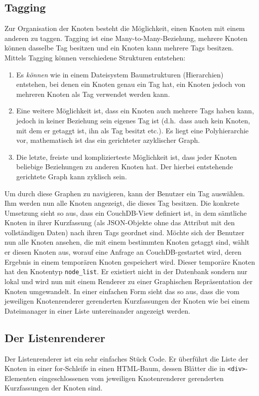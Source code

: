 \documentclass[12pt,ngerman,a4]{scrartcl}
\newcommand{\pquote}[1]{\glqq #1\grqq}
\newcommand{\code}[1]{\texttt{#1}}
\begin{document}
\subsection{Tagging}
Zur Organisation der Knoten besteht die Möglichkeit, einen Knoten mit einem anderen zu \pquote{taggen}. Tagging ist %
eine \pquote{Many-to-Many}-Beziehung, mehrere Knoten können dasselbe Tag besitzen und ein Knoten kann mehrere Tags besitzen. Mittels Tagging können verschiedene Strukturen entstehen:
\begin{enumerate}
\item Es \emph{können} wie in einem Dateisystem Baumstrukturen (Hierarchien) entstehen, bei denen ein Knoten genau ein Tag hat, ein Knoten jedoch von mehreren Knoten als Tag verwendet werden kann.
\item Eine weitere Möglichkeit ist, dass ein Knoten auch mehrere Tags haben kann, jedoch in keiner Beziehung sein eigenes Tag ist (d.h.\ dass auch kein Knoten, mit dem er getaggt ist, ihn als Tag besitzt etc.). Es liegt eine Polyhierarchie vor, mathematisch ist das ein gerichteter azyklischer Graph. 
\item Die letzte, freiste und komplizierteste Möglichkeit ist, dass jeder Knoten beliebige Beziehungen zu anderen Knoten hat. Der hierbei entstehende gerichtete Graph kann zyklisch sein.
\end{enumerate}
Um durch diese Graphen zu navigieren, kann der Benutzer ein Tag auswählen. Ihm werden nun alle Knoten angezeigt, die dieses Tag besitzen. Die konkrete Umsetzung sieht so aus, dass ein CouchDB-View definiert ist, in dem sämtliche Knoten in ihrer Kurzfassung (als JSON-Objekte ohne das Attribut mit den vollständigen Daten) nach ihren Tags geordnet sind. Möchte sich der Benutzer nun alle Knoten ansehen, die mit einem bestimmten Knoten getaggt sind, wählt er diesen Knoten aus, worauf eine Anfrage an CouchDB-gestartet wird, deren Ergebnis in einem temporären Knoten gespeichert wird. Dieser temporäre Knoten hat den Knotentyp \code{node\_list}. Er existiert nicht in der Datenbank sondern nur lokal und wird nun mit einem Renderer zu einer Graphischen Repräsentation der Knoten umgewandelt. In einer einfachen Form sieht das so aus, dass die vom jeweiligen Knotenrenderer gerenderten Kurzfassungen der Knoten wie bei einem Dateimanager in einer Liste untereinander angezeigt werden.
\subsection{Der Listenrenderer}
Der Listenrenderer ist ein sehr einfaches Stück Code. Er überführt die Liste der Knoten in einer for-Schleife in einen HTML-Baum, dessen Blätter die in \code{<div>}-Elementen eingeschlossenen vom jeweiligen Knotenrenderer gerenderten Kurzfassungen der Knoten sind.
\end{document}

